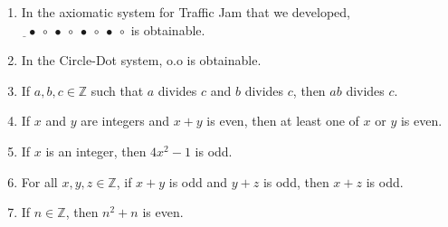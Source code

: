 \documentclass[11pt]{article}
\theoremstyle{definition}
\begin{document}
\begin{enumerate}

\item In the axiomatic system for Traffic Jam that we developed, $\underline{\ \ }\bullet~\circ~\bullet~\circ~\bullet~\circ~\bullet~\circ$ is obtainable.

\vfill

\item In the Circle-Dot system, o.o is obtainable.

\vfill

\item If $a, b, c\in\mathbb{Z}$ such that $a$ divides $c$ and $b$ divides $c$, then $ab$ divides $c$.

\vfill

\newpage

\item If $x$ and $y$ are integers and $x+y$ is even, then at least one of $x$ or $y$ is even.

\vfill

\item If $x$ is an integer, then $4x^{2}-1$ is odd.

\vfill

\item For all $x,y,z \in \mathbb{Z}$, if $x+y$ is odd and $y+z$ is odd, then $x+z$ is odd.

\vfill

\item If $n\in\mathbb{Z}$, then $n^{2}+n$ is even.

\vfill

\end{enumerate}
\end{document}
